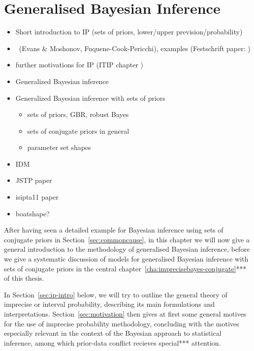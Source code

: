 \chapter{Generalised Bayesian Inference}
\label{cha:gbi}

\begin{itemize}
\item Short introduction to IP (sets of priors, lower/upper prevision/probability)
\item \pdc\ (Evans \& Moshonov, Fuquene-Cook-Pericchi), examples (Festschrift paper: \cite{Walter2010a})
\item further motivations for IP (ITIP chapter \cite{itip-statinf}) 
\item Generalized Bayesian inference
\item Generalized Bayesian inference with sets of priors
 \begin{itemize}
 \item sets of priors, GBR, robust Bayes
 \item sets of conjugate priors in general
 \item parameter set shapes
 \end{itemize}
\item IDM
\item JSTP paper \cite{Walter2009a}
\item isipta11 paper \cite{Walter2011a}
\item boatshape?
\end{itemize}



After having seen a detailed example for Bayesian inference using sets of conjugate priors in Section~\ref{sec:commoncause},
in this chapter we will now give a general introduction to the methodology of generalised Bayesian inference,
before we give a systematic discussion of models for generalised Bayesian inference with sets of conjugate priors
in the central chapter~\ref{cha:imprecisebayes-conjugate}*** of this thesis.

In Section~\ref{sec:ip-intro} below, we will try to outline the general theory of imprecise or interval probability,
describing its main formulations and interpretations.
Section~\ref{sec:motivation} then gives at first some general motives for the use of imprecise probability methodology,
concluding with the motives especially relevant in the context of the Bayesian approach to statistical inference,
among which prior-data conflict recieves special*** attention.

